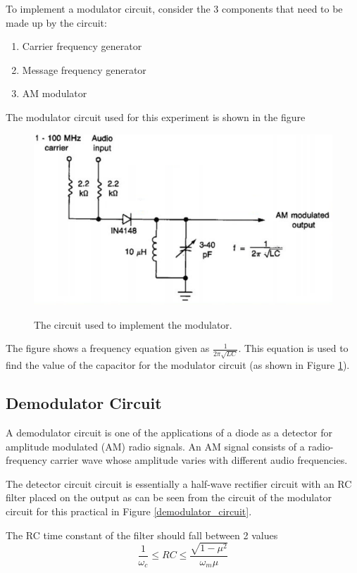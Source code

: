 \documentclass[12pt, a4paper]{article}
\begin{document}
		To implement a modulator circuit, consider the 3 components that need to be made up by the circuit:
		\begin{enumerate}
			\item Carrier frequency generator
			\item Message frequency generator
			\item AM modulator
		\end{enumerate}

		The modulator circuit used for this experiment is shown in the figure 
		\begin{figure}
			\includegraphics{images/modulator_circuit.png}
			\label{fig:modulator_circuit}
			\caption{The circuit used to implement the modulator.}
		\end{figure}

		The figure shows a frequency equation given as $\frac{1}{2\pi\sqrt{LC}}$. This equation is used to find the value of the capacitor for the modulator circuit (as shown in Figure \ref{fig:modulator_circuit}).
	\subsection{Demodulator Circuit}
		A demodulator circuit is one of the applications of a diode as a detector for amplitude modulated (AM) radio signals. An AM signal consists of a radio-frequency carrier wave whose amplitude varies with different audio frequencies.

		The detector circuit circuit is essentially a half-wave rectifier circuit with an RC filter placed on the output as can be seen from the circuit of the modulator circuit for this practical in Figure \ref{demodulator_circuit}.

		The RC time constant of the filter should fall between 2 values
		\begin{equation}
			\frac{1}{\omega_c} \le RC \le \frac{\sqrt{1-\mu^2}}{\omega_m\mu}
		\end{equation}
\end{document}
